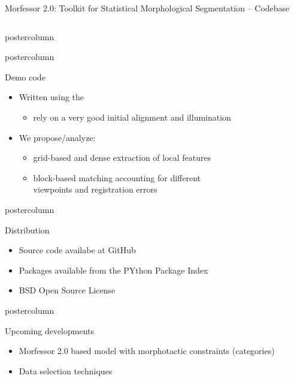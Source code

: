 \documentclass[final]{beamer} %
\begin{document}
\begin{frame}{Morfessor 2.0: Toolkit for Statistical Morphological Segmentation -- Codebase}
\begin{columns}
\begin{column}{.3\textwidth}
\begin{beamercolorbox}[center,wd=\textwidth]{postercolumn}
	\end{beamercolorbox}


  \begin{beamercolorbox}[center,wd=\textwidth]{postercolumn}
 \begin{block}{Demo code}
              \begin{itemize}
              \item Written using the 
                \begin{itemize}
                \item rely on a very good initial alignment and illumination
                \end{itemize}
              \item We propose/analyze:
                \begin{itemize}
                \item grid-based and dense extraction of local features
                \item block-based matching accounting for different\\
	                  viewpoints and registration errors
                \end{itemize}
              \end{itemize}              
            \end{block}
            
	\end{beamercolorbox}



  \begin{beamercolorbox}[center,wd=\textwidth]{postercolumn}
 \begin{block}{Distribution}
              \begin{itemize}
              \item Source code availabe at GitHub
		\item Packages available from the PYthon Package Index
              \item BSD Open Source License
\end{itemize}
            \end{block}
            
	\end{beamercolorbox}


  \begin{beamercolorbox}[center,wd=\textwidth]{postercolumn}
 \begin{block}{Upcoming developments}
              \begin{itemize}
		\item Morfessor 2.0 based model with morphotactic constraints (categories) 
              \item Data selection techniques
		

\end{itemize}
\end{block}
\end{beamercolorbox}
\end{column}
\end{columns}
\end{frame}
\end{document}
